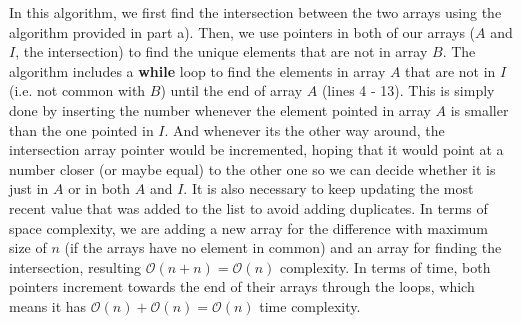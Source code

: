    In this algorithm, we first find the intersection between the two arrays using the algorithm provided in part a). Then, we use pointers in both of our 
    arrays ($A$ and $I$, the intersection) to find the unique elements that are not in array $B$.
    The algorithm includes a \textbf{while} loop to find the elements in array $A$ that are not in $I$ (i.e. not common with $B$) until the end of array $A$ (lines 4 - 13).
    This is simply done by inserting the number whenever the element pointed in array $A$ is smaller than the one pointed in $I$.
    And whenever its the other way around, the intersection array pointer would be incremented, hoping that it 
    would point at a number closer (or maybe equal) to the other one so we can decide whether it is just in $A$ or in both $A$ and $I$. It is also necessary to keep updating the most recent value
    that was added to the list to avoid adding duplicates. In terms of space complexity, we are adding a new array 
    for the difference with maximum size of $n$ (if the arrays have no element in common) and an array for finding the intersection, resulting $\mathcal{O}(n+n)=\mathcal{O}(n)$ complexity. In terms of time, both pointers
    increment towards the end of their arrays through the loops, which means it has $\mathcal{O}(n)+\mathcal{O}(n)=\mathcal{O}(n)$ time complexity. \\
    
